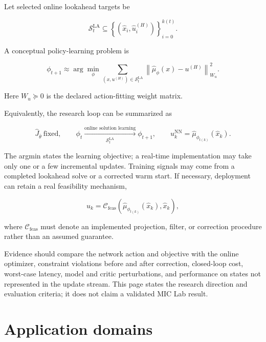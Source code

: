 \documentclass[a4paper]{article}
\begin{document}
Let selected online lookahead targets be

\begin{equation}
  \mathcal S_t^{\mathrm{LA}}
  \subseteq
  \left\{
  \left(\widehat x_i,\widehat u_i^{(H)}\right)
  \right\}_{i=0}^{k(t)} .
\end{equation}

A conceptual policy-learning problem is

\begin{equation}
  \phi_{t+1}
  \approx
  \arg\min_{\phi}
  \sum_{(x,u^{(H)})\in\mathcal S_t^{\mathrm{LA}}}
  \left\|
  \widehat\mu_{\phi}(x)-u^{(H)}
  \right\|_{W_u}^{2}.
\end{equation}

Here $W_u\succeq 0$ is the declared action-fitting weight matrix.

Equivalently, the research loop can be summarized as

\begin{equation}
  \widehat J_{\bar\theta}\ \text{fixed},
  \qquad
  \phi_t
  \xrightarrow[\mathcal S_t^{\mathrm{LA}}]
  {\text{online solution learning}}
  \phi_{t+1},
  \qquad
  u_k^{\mathrm{NN}}
  =\widehat\mu_{\phi_{t(k)}}(\widehat x_k).
\end{equation}

The argmin states the learning objective; a real-time implementation may take
only one or a few incremental updates. Training signals may come from a
completed lookahead solve or a corrected warm start. If necessary, deployment
can retain a real feasibility mechanism,

\begin{equation}
  u_k
  =
  \mathcal C_{\mathrm{feas}}
  \left(
  \widehat\mu_{\phi_{t(k)}}(\widehat x_k),
  \widehat x_k
  \right),
\end{equation}

where $\mathcal C_{\mathrm{feas}}$ must denote an implemented projection,
filter, or correction procedure rather than an assumed guarantee.

Evidence should compare the network action and objective with the online
optimizer, constraint violations before and after correction, closed-loop
cost, worst-case latency, model and critic perturbations, and performance on
states not represented in the update stream. This page states the research
direction and evaluation criteria; it does not claim a validated MIC Lab
result.

\section{Application domains}
\end{document}
